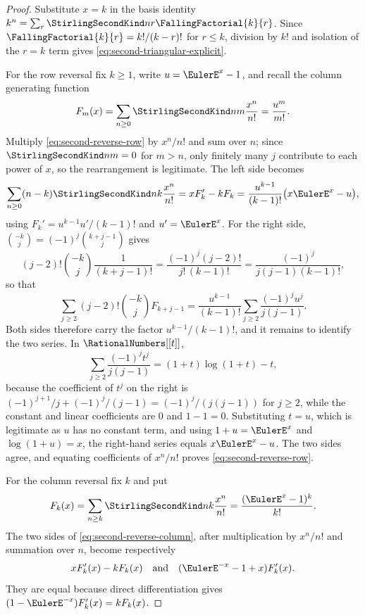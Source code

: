 \documentclass[11pt,a4paper,oneside,openany]{book}
\theoremstyle{definition}
\theoremstyle{remark}
\begin{document}
\begin{proof}
Substitute $x=k$ in the basis identity
$k^n=\sum_r\StirlingSecondKind nr\FallingFactorial{k}{r}$.  Since
$\FallingFactorial{k}{r}=k!/(k-r)!$ for $r\le k$, division by $k!$ and isolation of the
$r=k$ term gives \eqref{eq:second-triangular-explicit}.

For the row reversal fix $k\ge1$, write $u=\EulerE^x-1$, and recall the column generating
function
\[
 F_m(x)=\sum_{n\ge0}\StirlingSecondKind nm\frac{x^n}{n!}=\frac{u^m}{m!}.
\]
Multiply \eqref{eq:second-reverse-row} by $x^n/n!$ and sum over $n$; since
$\StirlingSecondKind nm=0$ for $m>n$, only finitely many $j$ contribute to each power of
$x$, so the rearrangement is legitimate.  The left side becomes
\[
 \sum_{n\ge0}(n-k)\StirlingSecondKind nk\frac{x^n}{n!}=xF_k'-kF_k
 =\frac{u^{k-1}}{(k-1)!}\bigl(x\EulerE^x-u\bigr),
\]
using $F_k'=u^{k-1}u'/(k-1)!$ and $u'=\EulerE^x$.  For the right side, $\binom{-k}{j}
=(-1)^j\binom{k+j-1}{j}$ gives
\[
 (j-2)!\binom{-k}{j}\frac1{(k+j-1)!}
 =\frac{(-1)^j(j-2)!}{j!\,(k-1)!}
 =\frac{(-1)^j}{j(j-1)(k-1)!},
\]
so that
\[
 \sum_{j\ge2}(j-2)!\binom{-k}{j}F_{k+j-1}
 =\frac{u^{k-1}}{(k-1)!}\sum_{j\ge2}\frac{(-1)^ju^j}{j(j-1)}.
\]
Both sides therefore carry the factor $u^{k-1}/(k-1)!$, and it remains to identify the two
series.  In $\RationalNumbers[[t]]$,
\begin{equation}\label{eq:log-quadratic-tail}
 \sum_{j\ge2}\frac{(-1)^jt^j}{j(j-1)}=(1+t)\log(1+t)-t,
\end{equation}
because the coefficient of $t^j$ on the right is
$(-1)^{j+1}/j+(-1)^{j}/(j-1)=(-1)^j/(j(j-1))$ for $j\ge2$, while the constant and linear
coefficients are $0$ and $1-1=0$.  Substituting $t=u$, which is legitimate as $u$ has no
constant term, and using $1+u=\EulerE^x$ and $\log(1+u)=x$, the right-hand series equals
$x\EulerE^x-u$.  The two sides agree, and equating coefficients of $x^n/n!$ proves
\eqref{eq:second-reverse-row}.

For the column reversal fix $k$ and put
\[
 F_k(x)=\sum_{n\ge k}\StirlingSecondKind nk\frac{x^n}{n!}
       =\frac{(\EulerE^x-1)^k}{k!}.
\]
The two sides of \eqref{eq:second-reverse-column}, after multiplication by
$x^n/n!$ and summation over $n$, become respectively
\[
 xF_k'(x)-kF_k(x)
 \quad\text{and}\quad
 (\EulerE^{-x}-1+x)F_k'(x).
\]
They are equal because direct differentiation gives
$(1-\EulerE^{-x})F_k'(x)=kF_k(x)$.
\end{proof}
\end{document}

